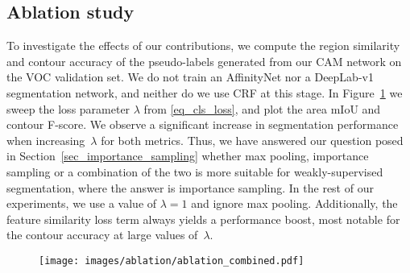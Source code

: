 \documentclass{article}
\begin{document}
\subsection{Ablation study}
\label{sec_ablation_study}

To investigate the effects of our contributions, we compute the region similarity and contour accuracy of the pseudo-labels generated from our CAM network on the VOC validation set. We do not train an AffinityNet nor a DeepLab-v1 segmentation network, and neither do we use CRF at this stage. In Figure~\ref{fig_ablation} we sweep the loss parameter $\lambda$ from \eqref{eq_cls_loss}, and plot the area mIoU and contour F-score. We observe a significant increase in segmentation performance when increasing~$\lambda$ for both metrics. Thus, we have answered our question posed in Section~\ref{sec_importance_sampling} whether max pooling, importance sampling or a combination of the two is more suitable for weakly-supervised segmentation, where the answer is importance sampling. In the rest of our experiments, we use a value of $\lambda=1$ and ignore max pooling. Additionally, the feature similarity loss term always yields a performance boost, most notable for the contour accuracy at large values of~$\lambda$.

\begin{figure}[p]
	\setlength\abovecaptionskip{-1pt}
	\centering
	\texttt{[image: images/ablation/ablation\_combined.pdf]}
	\label{fig_ablation}
\end{figure}
\end{document}
